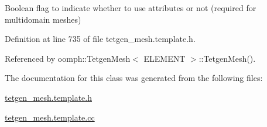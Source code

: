 Boolean flag to indicate whether to use attributes or not (required for multidomain meshes) 



Definition at line 735 of file tetgen\+\_\+mesh.\+template.\+h.



Referenced by oomph\+::\+Tetgen\+Mesh$<$ E\+L\+E\+M\+E\+N\+T $>$\+::\+Tetgen\+Mesh().



The documentation for this class was generated from the following files\+:\begin{DoxyCompactItemize}
\item 
\hyperlink{tetgen__mesh_8template_8h}{tetgen\+\_\+mesh.\+template.\+h}\item 
\hyperlink{tetgen__mesh_8template_8cc}{tetgen\+\_\+mesh.\+template.\+cc}\end{DoxyCompactItemize}
